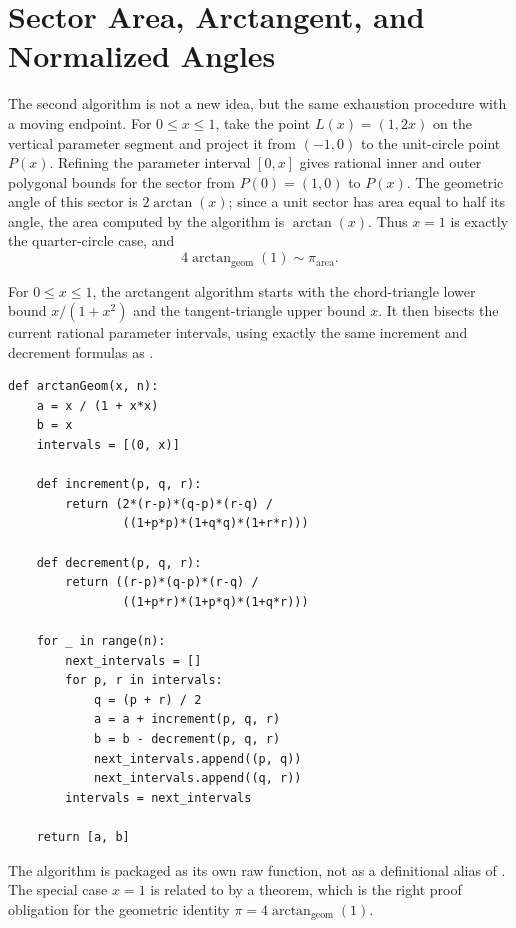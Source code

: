 \section{Sector Area, Arctangent, and Normalized Angles}

The second algorithm is not a new idea, but the same exhaustion procedure with
a moving endpoint.  For \(0\le x\le1\), take the point \(L(x)=(1,2x)\) on the
vertical parameter segment and project it from \((-1,0)\) to the unit-circle
point \(P(x)\).  Refining the parameter interval \([0,x]\) gives rational
inner and outer polygonal bounds for the sector from \(P(0)=(1,0)\) to
\(P(x)\).  The geometric angle of this sector is \(2\arctan(x)\); since a unit
sector has area equal to half its angle, the area computed by the algorithm is
\(\arctan(x)\).  Thus \(x=1\) is exactly the quarter-circle case, and
\[
  4\arctan_{\mathrm{geom}}(1)\sim \pi_{\mathrm{area}}.
\]

\begin{definition}
\label{def:geometric-arctan}
\label{def:arctan-area-stage-algorithm}
For \(0\le x\le1\), the arctangent algorithm starts with the chord-triangle
lower bound \(x/(1+x^2)\) and the tangent-triangle upper bound \(x\).  It then
bisects the current rational parameter intervals, using exactly the same
increment and decrement formulas as .
\begin{verbatim}
def arctanGeom(x, n):
    a = x / (1 + x*x)
    b = x
    intervals = [(0, x)]

    def increment(p, q, r):
        return (2*(r-p)*(q-p)*(r-q) /
                ((1+p*p)*(1+q*q)*(1+r*r)))

    def decrement(p, q, r):
        return ((r-p)*(q-p)*(r-q) /
                ((1+p*r)*(1+p*q)*(1+q*r)))

    for _ in range(n):
        next_intervals = []
        for p, r in intervals:
            q = (p + r) / 2
            a = a + increment(p, q, r)
            b = b - decrement(p, q, r)
            next_intervals.append((p, q))
            next_intervals.append((q, r))
        intervals = next_intervals

    return [a, b]
\end{verbatim}
The algorithm is packaged as its own raw function, not as a definitional
alias of .  The special case \(x=1\) is related to
 by a theorem, which is the right proof obligation for the
geometric identity \(\pi=4\arctan_{\mathrm{geom}}(1)\).
\end{definition}


